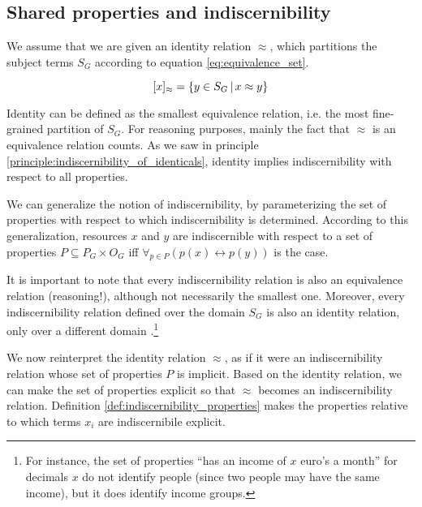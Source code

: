 \subsection{Shared properties and indiscernibility}
\label{sec:indiscernibility}

We assume that we are given an identity relation $\approx$,
  which partitions the subject terms $S_G$ according to
  equation \ref{eq:equivalence_set}.

\begin{equation}
\label{eq:equivalence_set}
  [x]_{\approx}
=
  \{
    y \in S_G
  \,\vert\,
    x \approx y
  \}
\end{equation}


Identity can be defined as the smallest equivalence relation,
  i.e. the most fine-grained partition of $S_G$.
For reasoning purposes, mainly the fact that $\approx$
  is an equivalence relation counts.
As we saw in principle \ref{principle:indiscernibility_of_identicals},
  identity implies indiscernibility with respect to all properties.

We can generalize the notion of indiscernibility,
  by parameterizing the set of properties with respect to which
  indiscernibility is determined.
According to this generalization,
  resources $x$ and $y$ are indiscernible with respect to
  a set of properties $P \subseteq P_G \times O_G$
  iff $\forall_{p \in P}(p(x) \leftrightarrow p(y))$ is the case.

It is important to note that every indiscernibility relation
  is also an equivalence relation (reasoning!),
  although not necessarily the smallest one.
Moreover, every indiscernibility relation defined over the domain $S_G$
  is also an identity relation,
  only over a different domain \cite{Quine1950}.\footnote{
    For instance, the set of properties
      ``has an income of $x$ euro's a month''
      for decimals $x$ do not identify people
      (since two people may have the same income),
      but it does identify income groups.
    }

We now reinterpret the identity relation $\approx$,
  as if it were an indiscernibility relation
  whose set of properties $P$ is implicit.
Based on the identity relation,
  we can make the set of properties explicit
  so that $\approx$ becomes an indiscernibility relation.
Definition \ref{def:indiscernibility_properties} makes
  the properties relative to which terms $x_i$ are indiscernibile
  explicit.

